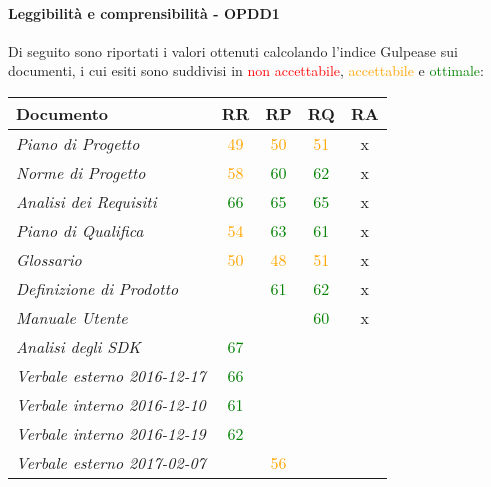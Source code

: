 \documentclass[PdQ.tex]{subfiles}
\begin{document}
		\paragraph{Leggibilità e comprensibilità - OPDD1}
				Di seguito sono riportati i valori ottenuti calcolando l'indice Gulpease sui documenti, i cui esiti sono suddivisi in \textcolor{red}{non accettabile}, \textcolor{orange}{accettabile} e \textcolor{green}{ottimale}:
				\begin{table}[h]
				\centering
				\begin{tabular}{l c c c c}
					\hline
					\rule[-0.3cm]{0cm}{0.8cm}
					\textbf{Documento} & \textbf{RR} & \textbf{RP} & \textbf{RQ} & \textbf{RA}\\
					\hline
					\rule[0cm]{0cm}{0.4cm}
					\textit{Piano di Progetto} & \textcolor{orange}{49} & \textcolor{orange}{50} & \textcolor{orange}{51} & x \\
					\rule[0cm]{0cm}{0.4cm}
					\textit{Norme di Progetto}& \textcolor{orange}{58} & \textcolor{green}{60} & \textcolor{green}{62} & x \\
					\rule[0cm]{0cm}{0.4cm}
					\textit{Analisi dei Requisiti} & \textcolor{green}{66} & \textcolor{green}{65} & \textcolor{green}{65} & x \\
					\rule[0cm]{0cm}{0.4cm}
					\textit{Piano di Qualifica} & \textcolor{orange}{54} & \textcolor{green}{63} & \textcolor{green}{61} & x \\
					\rule[0cm]{0cm}{0.4cm}
					\textit{Glossario} & \textcolor{orange}{50} & \textcolor{orange}{48} & \textcolor{orange}{51} & x\\
					\rule[0cm]{0cm}{0.4cm}
					\textit{Definizione di Prodotto} & & \textcolor{green}{61} & \textcolor{green}{62} & x \\
					\rule[0cm]{0cm}{0.4cm}
					\textit{Manuale Utente} & & & \textcolor{green}{60} & x \\
					\rule[0cm]{0cm}{0.4cm}
					\textit{Analisi degli SDK} & \textcolor{green}{67} & & & \\
					\rule[0cm]{0cm}{0.4cm}
					\textit{Verbale esterno 2016-12-17} & \textcolor{green}{66} & & &\\
					\rule[0cm]{0cm}{0.4cm}
					\textit{Verbale interno 2016-12-10} & \textcolor{green}{61} & & &\\
					\rule[0cm]{0cm}{0.4cm}
					\textit{Verbale interno 2016-12-19} & \textcolor{green}{62} & & &\\
					\rule[0cm]{0cm}{0.4cm}
					\textit{Verbale esterno 2017-02-07} & & \textcolor{orange}{56} & & \\

\end{tabular}
\end{table}
\end{document}
